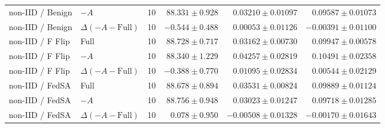 \begin{table}[t]
\begin{tabular}{llrrrr}
non-IID / Benign & $-A$ & 10 & $88.331 \pm 0.928$ & $0.03210 \pm 0.01097$ & $0.09587 \pm 0.01073$ \\
non-IID / Benign & $\Delta(-A-\mathrm{Full})$ & 10 & $-0.544 \pm 0.488$ & $0.00053 \pm 0.01126$ & $-0.00391 \pm 0.01100$ \\
non-IID / F Flip & Full & 10 & $88.728 \pm 0.717$ & $0.03162 \pm 0.00730$ & $0.09947 \pm 0.00578$ \\
non-IID / F Flip & $-A$ & 10 & $88.340 \pm 1.229$ & $0.04257 \pm 0.02819$ & $0.10491 \pm 0.02358$ \\
non-IID / F Flip & $\Delta(-A-\mathrm{Full})$ & 10 & $-0.388 \pm 0.770$ & $0.01095 \pm 0.02834$ & $0.00544 \pm 0.02129$ \\
non-IID / FedSA & Full & 10 & $88.678 \pm 0.894$ & $0.03531 \pm 0.00824$ & $0.09889 \pm 0.01124$ \\
non-IID / FedSA & $-A$ & 10 & $88.756 \pm 0.948$ & $0.03023 \pm 0.01247$ & $0.09718 \pm 0.01285$ \\
non-IID / FedSA & $\Delta(-A-\mathrm{Full})$ & 10 & $0.078 \pm 0.950$ & $-0.00508 \pm 0.01328$ & $-0.00170 \pm 0.01643$ \\
\bottomrule
\end{tabular}
\end{table}

